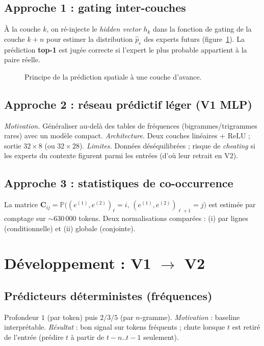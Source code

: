 \documentclass{article}
\begin{document}
\subsection{Approche 1 : gating inter-couches}
À la couche $k$, on ré-injecte le \emph{hidden vector} $h_{k}$ dans la fonction de gating de la couche $k\!+\!n$ pour estimer la distribution $\hat p_{e}$ des experts futurs (figure~\ref{fig:gating}). La prédiction \textbf{top-1} est jugée correcte si l'expert le plus probable appartient à la paire réelle.

\begin{figure}[ht]
  \centering
  \caption{Principe de la prédiction spatiale à une couche d'avance.}
  \label{fig:gating}
\end{figure}

\subsection{Approche 2 : réseau prédictif léger (V1 MLP)}
\textit{Motivation.} Généraliser au-delà des tables de fréquences (bigrammes/trigrammes rares) avec un modèle compact.  
\textit{Architecture.} Deux couches linéaires + ReLU ; sortie $32\times 8$ (ou $32\times 28$).  
\textit{Limites.} Données déséquilibrées ; risque de \emph{cheating} si les experts du contexte figurent parmi les entrées (d’où leur retrait en V2).

\subsection{Approche 3 : statistiques de co-occurrence}
La matrice $\mathbf{C}_{ij}=\mathbb P\big((e^{(1)},e^{(2)})_{\ell}=i,\,(e^{(1)},e^{(2)})_{\ell+1}=j\big)$ est estimée par comptage sur $\sim$630\,000 tokens. Deux normalisations comparées : (i) par lignes (conditionnelle) et (ii) globale (conjointe).

\section{Développement : V1 $\rightarrow$ V2}

\subsection{Prédicteurs déterministes (fréquences)}
Profondeur $1$ (par token) puis $2/3/5$ (par $n$-gramme). \textit{Motivation} : baseline interprétable. \textit{Résultat} : bon signal sur tokens fréquents ; chute lorsque $t$ est retiré de l’entrée (prédire $t$ à partir de $t-n..t-1$ seulement).
\end{document}
